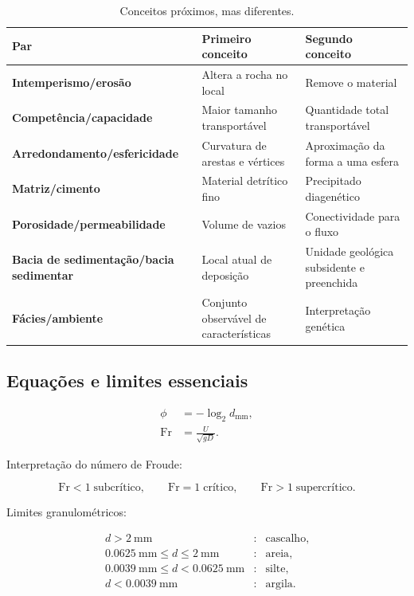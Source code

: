 \begin{table}[H]
  \centering
  \caption{Conceitos próximos, mas diferentes.}
  \begin{tabularx}{\textwidth}{>{\bfseries}lXX}
    \toprule
    Par & Primeiro conceito & Segundo conceito \\
    \midrule
    Intemperismo/erosão & Altera a rocha no local & Remove o material \\
    Competência/capacidade & Maior tamanho transportável & Quantidade total transportável \\
    Arredondamento/esfericidade & Curvatura de arestas e vértices & Aproximação da forma a uma esfera \\
    Matriz/cimento & Material detrítico fino & Precipitado diagenético \\
    Porosidade/permeabilidade & Volume de vazios & Conectividade para o fluxo \\
    Bacia de sedimentação/bacia sedimentar & Local atual de deposição & Unidade geológica subsidente e preenchida \\
    Fácies/ambiente & Conjunto observável de características & Interpretação genética \\
    \bottomrule
  \end{tabularx}
\end{table}

\subsection{Equações e limites essenciais}

\begin{align*}
  \phi &= -\log_2 d_{\mathrm{mm}}, \\
  \mathrm{Fr} &= \frac{U}{\sqrt{gD}}.
\end{align*}

Interpretação do número de Froude:

\[
\mathrm{Fr}<1\;\text{subcrítico},
\qquad
\mathrm{Fr}=1\;\text{crítico},
\qquad
\mathrm{Fr}>1\;\text{supercrítico}.
\]

Limites granulométricos:

\[
\begin{array}{rcl}
d>\SI{2}{\milli\metre} &:& \text{cascalho},\\
\SI{0.0625}{\milli\metre}\le d\le\SI{2}{\milli\metre} &:& \text{areia},\\
\SI{0.0039}{\milli\metre}\le d<\SI{0.0625}{\milli\metre} &:& \text{silte},\\
d<\SI{0.0039}{\milli\metre} &:& \text{argila}.
\end{array}
\]

